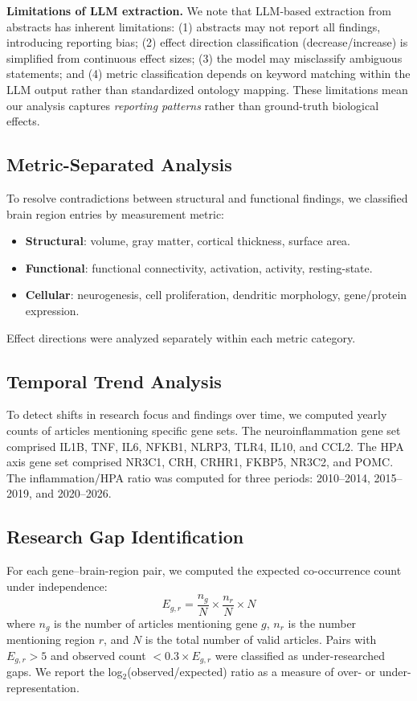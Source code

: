 \documentclass[12pt,a4paper]{article}
\begin{document}
\textbf{Limitations of LLM extraction.} We note that LLM-based extraction from abstracts has inherent limitations: (1) abstracts may not report all findings, introducing reporting bias; (2) effect direction classification (decrease/increase) is simplified from continuous effect sizes; (3) the model may misclassify ambiguous statements; and (4) metric classification depends on keyword matching within the LLM output rather than standardized ontology mapping. These limitations mean our analysis captures \textit{reporting patterns} rather than ground-truth biological effects.

\subsection{Metric-Separated Analysis}

To resolve contradictions between structural and functional findings, we classified brain region entries by measurement metric:
\begin{itemize}
    \item \textbf{Structural}: volume, gray matter, cortical thickness, surface area.
    \item \textbf{Functional}: functional connectivity, activation, activity, resting-state.
    \item \textbf{Cellular}: neurogenesis, cell proliferation, dendritic morphology, gene/protein expression.
\end{itemize}
Effect directions were analyzed separately within each metric category.

\subsection{Temporal Trend Analysis}

To detect shifts in research focus and findings over time, we computed yearly counts of articles mentioning specific gene sets. The neuroinflammation gene set comprised IL1B, TNF, IL6, NFKB1, NLRP3, TLR4, IL10, and CCL2. The HPA axis gene set comprised NR3C1, CRH, CRHR1, FKBP5, NR3C2, and POMC. The inflammation/HPA ratio was computed for three periods: 2010--2014, 2015--2019, and 2020--2026.

\subsection{Research Gap Identification}

For each gene--brain-region pair, we computed the expected co-occurrence count under independence:
\begin{equation}
E_{g,r} = \frac{n_g}{N} \times \frac{n_r}{N} \times N
\end{equation}
where $n_g$ is the number of articles mentioning gene $g$, $n_r$ is the number mentioning region $r$, and $N$ is the total number of valid articles. Pairs with $E_{g,r} > 5$ and observed count $< 0.3 \times E_{g,r}$ were classified as under-researched gaps. We report the log$_2$(observed/expected) ratio as a measure of over- or under-representation.
\end{document}
